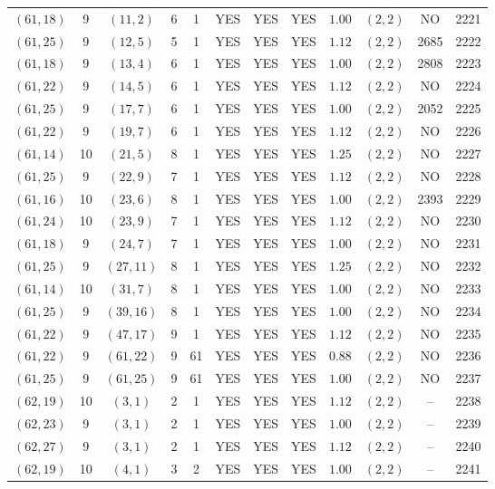 \begin{longtable}{|c|c|c|c|c|c|c|c|c|c|c|c|}
$(61,18)$ & 9 & $(11,2)$ & 6 & 1 & YES & YES & YES & $1.00$ & $(2,2)$ & NO & 2221\\
$(61,25)$ & 9 & $(12,5)$ & 5 & 1 & YES & YES & YES & $1.12$ & $(2,2)$ & 2685 & 2222\\
$(61,18)$ & 9 & $(13,4)$ & 6 & 1 & YES & YES & YES & $1.00$ & $(2,2)$ & 2808 & 2223\\
$(61,22)$ & 9 & $(14,5)$ & 6 & 1 & YES & YES & YES & $1.12$ & $(2,2)$ & NO & 2224\\
$(61,25)$ & 9 & $(17,7)$ & 6 & 1 & YES & YES & YES & $1.00$ & $(2,2)$ & 2052 & 2225\\
$(61,22)$ & 9 & $(19,7)$ & 6 & 1 & YES & YES & YES & $1.12$ & $(2,2)$ & NO & 2226\\
$(61,14)$ & 10 & $(21,5)$ & 8 & 1 & YES & YES & YES & $1.25$ & $(2,2)$ & NO & 2227\\
$(61,25)$ & 9 & $(22,9)$ & 7 & 1 & YES & YES & YES & $1.12$ & $(2,2)$ & NO & 2228\\
$(61,16)$ & 10 & $(23,6)$ & 8 & 1 & YES & YES & YES & $1.00$ & $(2,2)$ & 2393 & 2229\\
$(61,24)$ & 10 & $(23,9)$ & 7 & 1 & YES & YES & YES & $1.12$ & $(2,2)$ & NO & 2230\\
$(61,18)$ & 9 & $(24,7)$ & 7 & 1 & YES & YES & YES & $1.00$ & $(2,2)$ & NO & 2231\\
$(61,25)$ & 9 & $(27,11)$ & 8 & 1 & YES & YES & YES & $1.25$ & $(2,2)$ & NO & 2232\\
$(61,14)$ & 10 & $(31,7)$ & 8 & 1 & YES & YES & YES & $1.00$ & $(2,2)$ & NO & 2233\\
$(61,25)$ & 9 & $(39,16)$ & 8 & 1 & YES & YES & YES & $1.00$ & $(2,2)$ & NO & 2234\\
$(61,22)$ & 9 & $(47,17)$ & 9 & 1 & YES & YES & YES & $1.12$ & $(2,2)$ & NO & 2235\\
$(61,22)$ & 9 & $(61,22)$ & 9 & 61 & YES & YES & YES & $0.88$ & $(2,2)$ & NO & 2236\\
$(61,25)$ & 9 & $(61,25)$ & 9 & 61 & YES & YES & YES & $1.00$ & $(2,2)$ & NO & 2237\\
$(62,19)$ & 10 & $(3,1)$ & 2 & 1 & YES & YES & YES & $1.12$ & $(2,2)$ & -- & 2238\\
$(62,23)$ & 9 & $(3,1)$ & 2 & 1 & YES & YES & YES & $1.00$ & $(2,2)$ & -- & 2239\\
$(62,27)$ & 9 & $(3,1)$ & 2 & 1 & YES & YES & YES & $1.12$ & $(2,2)$ & -- & 2240\\
$(62,19)$ & 10 & $(4,1)$ & 3 & 2 & YES & YES & YES & $1.00$ & $(2,2)$ & -- & 2241\\

\end{longtable}
